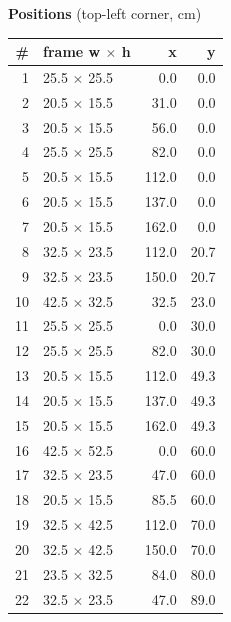 \documentclass[a4paper,landscape,10pt]{article}
\begin{document}
\begin{minipage}[t]{0.25\textwidth}
\vspace{8pt}
{\bfseries Positions} (top-left corner, cm)\\[2pt]
\tiny
\begin{tabular}{@{}r l r r@{}}
\toprule
\# & frame w $\times$ h & x & y \\
\midrule
1 & 25.5 $\times$ 25.5 & 0.0 & 0.0 \\
2 & 20.5 $\times$ 15.5 & 31.0 & 0.0 \\
3 & 20.5 $\times$ 15.5 & 56.0 & 0.0 \\
4 & 25.5 $\times$ 25.5 & 82.0 & 0.0 \\
5 & 20.5 $\times$ 15.5 & 112.0 & 0.0 \\
6 & 20.5 $\times$ 15.5 & 137.0 & 0.0 \\
7 & 20.5 $\times$ 15.5 & 162.0 & 0.0 \\
8 & 32.5 $\times$ 23.5 & 112.0 & 20.7 \\
9 & 32.5 $\times$ 23.5 & 150.0 & 20.7 \\
10 & 42.5 $\times$ 32.5 & 32.5 & 23.0 \\
11 & 25.5 $\times$ 25.5 & 0.0 & 30.0 \\
12 & 25.5 $\times$ 25.5 & 82.0 & 30.0 \\
13 & 20.5 $\times$ 15.5 & 112.0 & 49.3 \\
14 & 20.5 $\times$ 15.5 & 137.0 & 49.3 \\
15 & 20.5 $\times$ 15.5 & 162.0 & 49.3 \\
16 & 42.5 $\times$ 52.5 & 0.0 & 60.0 \\
17 & 32.5 $\times$ 23.5 & 47.0 & 60.0 \\
18 & 20.5 $\times$ 15.5 & 85.5 & 60.0 \\
19 & 32.5 $\times$ 42.5 & 112.0 & 70.0 \\
20 & 32.5 $\times$ 42.5 & 150.0 & 70.0 \\
21 & 23.5 $\times$ 32.5 & 84.0 & 80.0 \\
22 & 32.5 $\times$ 23.5 & 47.0 & 89.0 \\
\bottomrule
\end{tabular}
\end{minipage}
\clearpage
\end{document}
